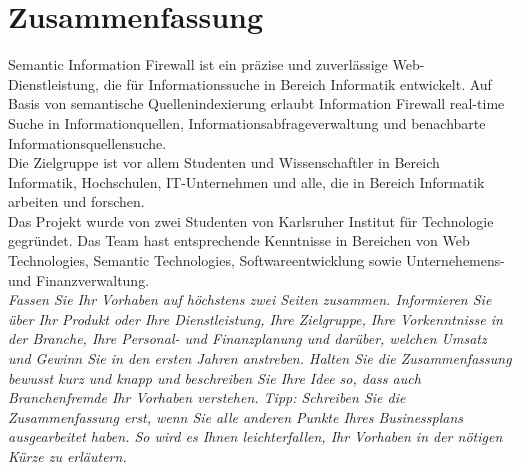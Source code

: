 \section{Zusammenfassung}

Semantic Information Firewall ist ein präzise und zuverlässige Web-Dienstleistung, die für Informationssuche in Bereich Informatik entwickelt. Auf Basis von semantische Quellenindexierung erlaubt Information Firewall real-time Suche in Informationquellen, Informationsabfrageverwaltung und benachbarte Informationsquellensuche.\\
Die Zielgruppe ist vor allem Studenten und Wissenschaftler in Bereich Informatik, Hochschulen, IT-Unternehmen und alle, die in Bereich Informatik arbeiten und forschen.\\
Das Projekt wurde von zwei Studenten von Karlsruher Institut für Technologie gegründet. Das Team hast entsprechende Kenntnisse in Bereichen von Web Technologies, Semantic Technologies, Softwareentwicklung sowie Unternehemens- und Finanzverwaltung. \\


\emph{Fassen Sie Ihr Vorhaben auf höchstens zwei Seiten zusammen. Informieren Sie über Ihr Produkt oder Ihre Dienstleistung, Ihre Zielgruppe, Ihre Vorkenntnisse in der Branche, Ihre Personal- und Finanzplanung und darüber, welchen Umsatz und Gewinn Sie in den ersten Jahren anstreben. Halten Sie die Zusammenfassung bewusst kurz und knapp und beschreiben Sie Ihre Idee so, dass auch Branchenfremde Ihr Vorhaben verstehen. Tipp: Schreiben Sie die Zusammenfassung erst, wenn Sie alle anderen Punkte Ihres Businessplans ausgearbeitet haben. So wird es Ihnen leichterfallen, Ihr Vorhaben in der nötigen Kürze zu erläutern.}
